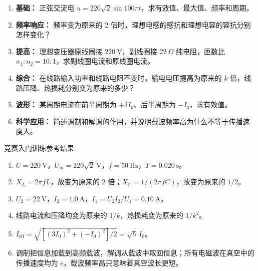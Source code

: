 \begin{enumerate}
  \item \textbf{基础：} 正弦交流电 $u=220\sqrt2\sin100\pi t$，求有效值、最大值、频率和周期。
  \item \textbf{频率响应：} 频率变为原来的 $2$ 倍时，理想电感的感抗和理想电容的容抗分别怎样变化？
  \item \textbf{提高：} 理想变压器原线圈接 $220\ \mathrm{V}$，副线圈接 $22\ \Omega$ 纯电阻，匝数比 $n_1:n_2=10:1$，求副线圈电流和原线圈电流。
  \item \textbf{综合：} 在线路输入功率和线路电阻不变时，输电电压提高为原来的 $k$ 倍，线路压降、热损耗分别变为原来的多少？
  \item \textbf{波形：} 某周期电流在前半周期为 $+3I_0$、后半周期为 $-I_0$，求有效值。
  \item \textbf{科学应用：} 简述调制和解调的作用，并说明载波频率高为什么不等于传播速度大。
\end{enumerate}

\begin{learningbox}{竞赛入门训练参考结果}
\begin{enumerate}[itemsep=0.45em,topsep=0.3em,parsep=0pt]
  \item $U=220\ \mathrm V$，$U_m=220\sqrt2\ \mathrm V$，$f=50\ \mathrm{Hz}$，$T=0.020\ \mathrm s$。
  \item $X_L=2\pi fL$，故变为原来的 $2$ 倍；$X_C=1/(2\pi fC)$，故变为原来的 $1/2$。
  \item $U_2=22\ \mathrm V$，$I_2=1.0\ \mathrm A$，$I_1=U_2I_2/U_1=0.10\ \mathrm A$。
  \item 线路电流和压降均变为原来的 $1/k$，热损耗变为原来的 $1/k^2$。
  \item $I_{\mathrm{eff}}=\sqrt{[(3I_0)^2+(-I_0)^2]/2}=\sqrt5\,I_0$。
  \item 调制把信息加载到高频载波，解调从载波中取回信息；所有电磁波在真空中的传播速度均为 $c$，载波频率高只意味着真空波长更短。
\end{enumerate}
\end{learningbox}

